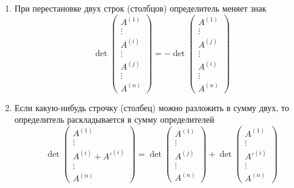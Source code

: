 \documentclass[a4paper,12pt]{article}
\begin{document}
\begin{enumerate}
\[\begin{matrix}
		\end{matrix}
		\right)
		\]
		\item При перестановке двух строк (столбцов) определитель меняет знак
		\[
		\det\left(
		\begin{matrix}
		A^{(1)}\\
		\vdots\\
		A^{(i)}\\
		\vdots\\
		A^{(j)}\\
		\vdots\\
		A^{(n)}
		
		\end{matrix}
		\right)
		=
		- \det\left(
		\begin{matrix}
		A^{(1)}\\
		\vdots\\
		A^{(j)}\\
		\vdots\\
		A^{(i)}\\
		\vdots\\
		A^{(n)}
		
		\end{matrix}
		\right)
		\]
		\item Если какую-нибудь строчку (столбец) можно разложить в сумму двух, то определитель раскладывается в сумму определителей
		\[
		\det\left(
		\begin{matrix}
		A^{(1)}\\
		\vdots\\
		A^{(i)} + A'^{(i)}\\
		\vdots\\
		A^{(n)}
		
		\end{matrix}
		\right)
		=
		\det\left(
		\begin{matrix}
		A^{(1)}\\
		\vdots\\
		A^{(j)}\\
		\vdots\\
		A^{(n)}
		
		\end{matrix}
		\right)
		+
		\det\left(
		\begin{matrix}
		A^{(1)}\\
		\vdots\\
		A'^{(i)}\\
		\vdots\\
		A^{(n)}
		
		\end{matrix}
		\right)
		\]
	

\end{enumerate}
\end{document}
